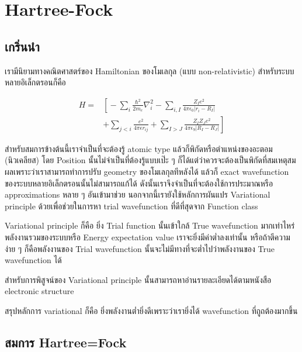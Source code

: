 
\chapter{Hartree-Fock}

\section{เกริ่นนำ}

เรามีนิยามทางคณิตศาสตร์ของ Hamiltonian ของโมเลกุล (แบบ non-relativistic) สำหรับระบบหลายอิเล็กตรอนก็คือ

\begin{equation}
    \begin{aligned}
        H = &
        \left[ \right.
        -\sum_{i} \frac{\hbar^{2}}{2m_{e}} \nabla^{2}_{i}
        -\sum_{i,I} \frac{Z_{I} e^{2}}{4\pi\epsilon_{0} |r_{i} - R_{I}|} \\
            & +\sum_{j<i} \frac{e^{2}}{4\pi\epsilon r_{ij}}
        +\sum_{I>J} \frac{Z_{I} Z_{J} e^{2}}{4\pi\epsilon_{9} |R_{I} - R_{J}|}
        \left. \right]
    \end{aligned}
\end{equation}

สำหรับสมการข้างต้นนี้เราจำเป็นที่จะต้องรู้ atomic type แล้วก็พิกัดหรือตำแหน่งของอะตอม (นิวเคลียส)
โดย Position นั้นไม่จำเป็นที่ต้องรู้แบบเป๊ะ ๆ ก็ได้แต่ว่าควรจะต้องเป็นพิกัดที่สมเหตุสมผลเพราะว่าเราสามารถทำการปรับ
geometry ของโมเลกุลทีหลังได้ แล้วก็ exact wavefunction ของระบบหลายอิเล็กตรอนนั้นไม่สามารถแก้ได้
ดังนั้นเราจึงจำเป็นที่จะต้องใช้การประมาณหรือ approximations หลาย ๆ อันเข้ามาช่วย นอกจากนี้เรายังใช้หลักการผันแปร
Variational principle ด้วยเพื่อช่วยในการหา trial wavefunction ที่ดีที่สุดจาก Function class

Variational principle ก็คือ ยิ่ง Trial function นั้นเข้าใกล้ True wavefunction มากเท่าไหร่
พลังงานรวมของระบบหรือ Energy expectation value เราจะยิ่งมีค่าต่ำลงเท่านั้น หรือถ้าตีความง่าย ๆ
ก็คือพลังงานของ Trial wavefunction นั้นจะไม่มีทางที่จะต่ำไปว่าพลังงานของ True wavefunction ได้

สำหรับการพิสูจน์ของ Variational principle นั้นสามารถหาอ่านรายละเอียดได้ตามหนังสือ electronic
structure

สรุปหลักการ variational ก็คือ ยิ่งพลังงานต่ำยิ่งดีเพราะว่าเรายิ่งได้ wavefunction ที่ถูถต้องมากขึ้น

\section{สมการ Hartree=Fock}


